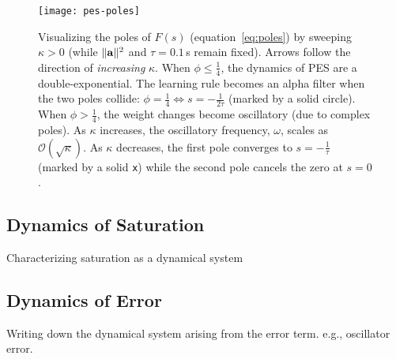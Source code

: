 \begin{figure}
\centering
\texttt{[image: pes-poles]}
\caption{ \label{fig:pes-poles}
  Visualizing the poles of $F(s)$ (equation~\ref{eq:poles}) by sweeping $\kappa > 0$ (while $\| \mathbf{a} \|^2$  and $\tau = 0.1\,$s remain fixed).
  Arrows follow the direction of \emph{increasing} $\kappa$.
  When $\phi \le \frac{1}{4}$, the dynamics of PES are a double-exponential.
  The learning rule becomes an alpha filter when the two poles collide: $\phi = \frac{1}{4} \iff s = -\frac{1}{2\tau}$ (marked by a solid circle).
  When $\phi > \frac{1}{4}$, the weight changes become oscillatory (due to complex poles).
  As $\kappa$ increases, the oscillatory frequency, $\omega$, scales as $\mathcal{O}\left(\sqrt{\kappa}\right)$.
  As $\kappa$ decreases, the first pole converges to $s = -\frac{1}{\tau}$ (marked by a solid \texttt{x}) while the second pole cancels the zero at $s = 0$. %
}
\end{figure}

\subsection{Dynamics of Saturation}

Characterizing saturation as a dynamical system

\subsection{Dynamics of Error}

Writing down the dynamical system arising from the error term. e.g., oscillator error.


